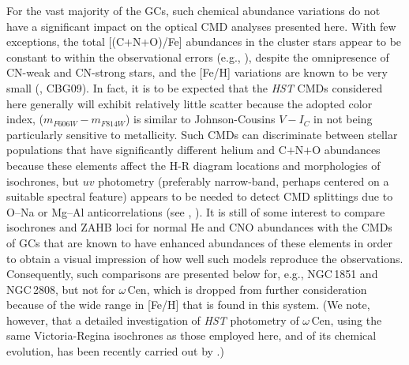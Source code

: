 \documentclass[12pt,preprint]{aastex}
\begin{document}
For the vast majority of the GCs, such chemical abundance variations do not 
have a significant impact on the optical CMD analyses presented here.  With few
exceptions, the total [(C+N+O)/Fe] abundances in the cluster stars appear to be
constant to within the observational errors (e.g., \citealt{ssb96}), despite the
omnipresence of CN-weak and CN-strong stars, and the [Fe/H] variations are known
to be very small (\citealt{kra94}, CBG09).  In fact, it is to be expected that
the {\it HST} CMDs considered here generally will exhibit relatively little
scatter because the adopted color index, ($m_{F606W} - m_{F814W}$) is similar
to Johnson-Cousins $V-I_C$ in not being particularly sensitive to metallicity.
Such CMDs can discriminate between stellar populations that have significantly
different helium and C$+$N$+$O abundances because these elements affect the
H-R diagram locations and morphologies of isochrones, but $uv$ photometry
(preferably narrow-band, perhaps centered on a suitable spectral feature)
appears to be needed to detect CMD splittings due to O--Na or Mg--Al
anticorrelations (see \citealt{ssw11}, \citealt{cmp13}).  It is still of some
interest to compare isochrones and ZAHB loci for normal He and CNO abundances
with the CMDs of GCs that are known to have enhanced abundances of these
elements in order to obtain a visual impression of how well such models
reproduce the observations.  Consequently, such comparisons are presented below
for, e.g., NGC$\,$1851 and NGC$\,$2808, but not for $\omega\,$Cen, which is
dropped from further consideration because of the wide range in [Fe/H] that is
found in this system.  (We note, however, that a detailed investigation of
{\it HST} photometry of $\omega\,$Cen, using the same Victoria-Regina isochrones
as those employed here, and of its chemical evolution, has been recently carried
out by \citealt{hvn12}.)
\end{document}
